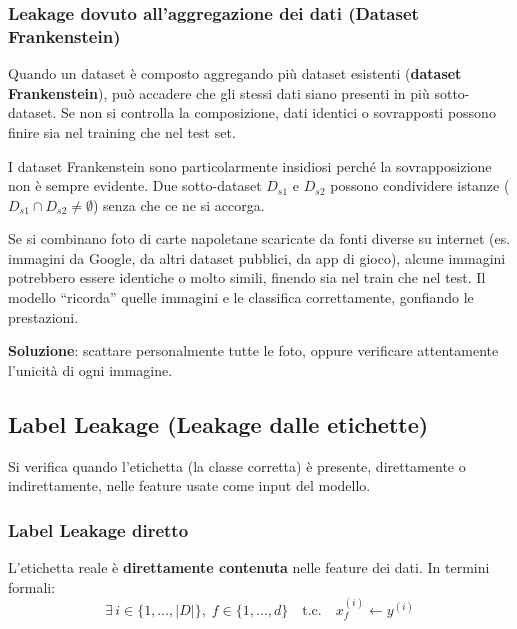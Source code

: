 \documentclass[a4paper,12pt]{article}
\begin{document}
\subsubsection{Leakage dovuto all'aggregazione dei dati (Dataset Frankenstein)}

Quando un dataset è composto aggregando più dataset esistenti (\textbf{dataset Frankenstein}), può accadere che gli stessi dati siano presenti in più sotto-dataset. Se non si controlla la composizione, dati identici o sovrapposti possono finire sia nel training che nel test set.

\begin{attenzione}
I dataset Frankenstein sono particolarmente insidiosi perché la sovrapposizione non è sempre evidente. Due sotto-dataset $D_{s1}$ e $D_{s2}$ possono condividere istanze ($D_{s1} \cap D_{s2} \neq \emptyset$) senza che ce ne si accorga.
\end{attenzione}

\begin{esempio}
Se si combinano foto di carte napoletane scaricate da fonti diverse su internet (es. immagini da Google, da altri dataset pubblici, da app di gioco), alcune immagini potrebbero essere identiche o molto simili, finendo sia nel train che nel test. Il modello ``ricorda'' quelle immagini e le classifica correttamente, gonfiando le prestazioni.

\textbf{Soluzione}: scattare personalmente tutte le foto, oppure verificare attentamente l'unicità di ogni immagine.
\end{esempio}

\subsection{Label Leakage (Leakage dalle etichette)}

Si verifica quando l'etichetta (la classe corretta) è presente, direttamente o indirettamente, nelle feature usate come input del modello.

\subsubsection{Label Leakage diretto}

L'etichetta reale è \textbf{direttamente contenuta} nelle feature dei dati. In termini formali:
$$\exists\, i \in \{1,\ldots,|D|\},\; f \in \{1,\ldots,d\} \quad \text{t.c.} \quad x_f^{(i)} \leftarrow y^{(i)}$$
\end{document}
